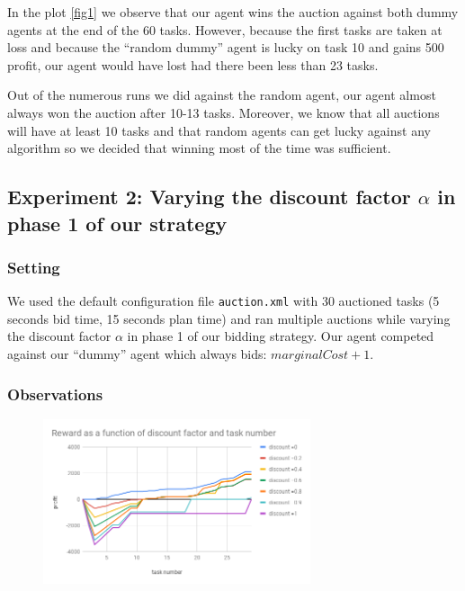 \documentclass[11pt]{article}
\begin{document}
  In the plot \ref{fig1} we observe that our agent wins the auction against both dummy
  agents at the end of the 60 tasks. However, because the first tasks are taken
  at loss and because the ``random dummy'' agent is lucky on task 10 and gains
  500 profit, our agent would have lost had there been less than 23 tasks. 
  

  Out of the numerous runs we did against the random agent, our agent almost
  always won the auction after 10-13 tasks. Moreover, we know that all auctions
  will have at least 10 tasks and that random agents can get lucky against any
  algorithm so we decided that winning most of the time was sufficient.

  \subsection{Experiment 2: Varying the discount factor $\alpha$ in phase 1 of
  our strategy}
  

  \subsubsection{Setting}
  
  We used the default configuration file \texttt{auction.xml} with 30 auctioned
  tasks (5 seconds bid time, 15 seconds plan time) and ran multiple auctions
  while varying the discount factor $\alpha$ in phase 1 of our bidding strategy.
  Our agent competed against our ``dummy'' agent which always bids:
  $marginalCost + 1$.

  \subsubsection{Observations}

\begin{figure}
  \vspace{-20pt}
    \label{fig2}
 \includegraphics[width=0.7\textwidth]{discount.png}
 \vspace{-20pt}
 \end{figure} 
  
\end{document}
